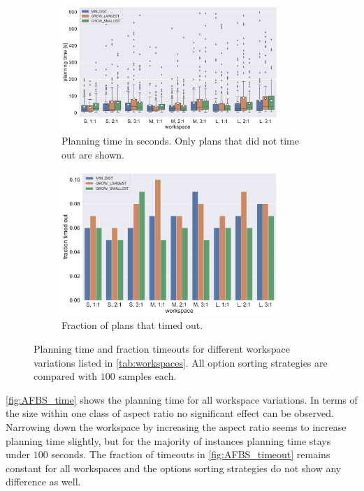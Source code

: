 \begin{figure}
	\centering
	\begin{subfigure}[b]{\textwidth}
		\centering
		\includegraphics[width=0.9\textwidth]{figures/plots/AFBS_time.pdf}
		\caption{Planning time in seconds. Only plans that did not time out are shown.}
		\label{fig:AFBS_time}
	\end{subfigure}
	
	\begin{subfigure}[b]{\textwidth}
		\centering
		\includegraphics[width=0.9\textwidth]{figures/plots/AFBS_timeout.pdf}
		\caption{Fraction of plans that timed out.}
		\label{fig:AFBS_timeout}
	\end{subfigure}
	\caption[Planning time and fraction of timeouts for different workspace variations]{Planning time and fraction timeouts for different workspace variations listed in \autoref{tab:workspaces}. All option sorting strategies are compared with $100$ samples each.}
	\label{fig:AFBS_timestats}
\end{figure}

\autoref{fig:AFBS_time} shows the planning time for all workspace variations.
In terms of the size within one class of aspect ratio no significant effect can be observed.
Narrowing down the workspace by increasing the aspect ratio seems to increase planning time slightly, but for the majority of instances planning time stays under $100$ seconds.
The fraction of timeouts in \autoref{fig:AFBS_timeout} remains constant for all workspaces and the options sorting strategies do not show any difference as well.

